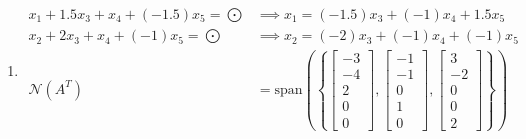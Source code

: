 \documentclass[12pt,fleqn,leqno,letterpaper]{article}
\begin{document}
\begin{enumerate}
\begin{align*}
					\begin{bmatrix} 11 \\ -8 \\ -4  \end{bmatrix}
					\begin{bmatrix} -4 \\ -6 \\ 1 \end{bmatrix}
					\right\}\\
			  P_{1} &=
					\begin{bmatrix} -4 & 11 & -4 \\ 3 & -8 & -6 \\ 2 & -4 & 1 \end{bmatrix}
			\end{align*}
		\item[1c.]
				\begin{align*}
					x_{1} + 1.5x_{3} + x_{4} + (-1.5)x_{5} = \bigodot &\implies x_{1} = (-1.5)x_{3} + (-1)x_{4} + 1.5x_{5} \\
					x_{2} + 2x_{3} + x_{4} + (-1)x_{5} = \bigodot &\implies x_{2} = (-2)x_{3} + (-1)x_{4} + (-1)x_{5}\\
					\mathcal{N}(A^{T}) &= \text{span}\left(\left\{
															 \begin{bmatrix} -3\\-4\\2\\0\\0 \end{bmatrix},
															 \begin{bmatrix} -1\\-1\\0\\1\\0 \end{bmatrix},
															 \begin{bmatrix} 3\\-2\\0\\0\\2 \end{bmatrix}
															 \right\}\right)\\

\end{align*}
\end{enumerate}
\end{document}
